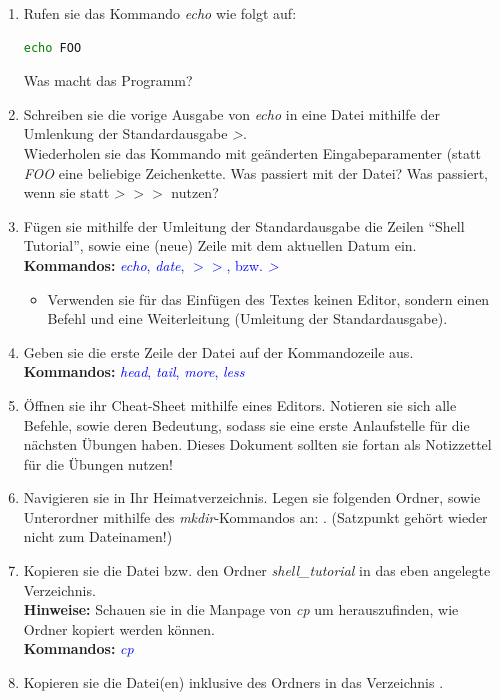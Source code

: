 \documentclass[paper=a4,fontsize=11pt]{scrartcl}%
\numberwithin{equation}{section}
\begin{document}
\begin{enumerate}
\begin{enumerate}[label=(\alph*)]
		\item Rufen sie das Kommando \emph{echo} wie folgt auf:
		\begin{lstlisting}[style=Bash, language=Bash]
echo FOO
\end{lstlisting}
		Was macht das Programm?
		\item Schreiben sie die vorige Ausgabe von \emph{echo} in eine Datei mithilfe der Umlenkung der Standardausgabe \emph{>}.\\
		Wiederholen sie das Kommando mit geänderten Eingabeparamenter (statt \emph{FOO} eine beliebige Zeichenkette. Was passiert mit der Datei? Was passiert, wenn sie statt \emph{>} \emph{$>>$} nutzen?
		\item Fügen sie mithilfe der Umleitung der Standardausgabe die Zeilen \enquote{Shell Tutorial}, sowie eine (neue) Zeile mit dem aktuellen Datum ein.\\
		\textbf{Kommandos:} \textcolor{blue}{\emph{echo}, \emph{date}, $>>$, bzw. \emph{>}}
		\begin{itemize}
			\item \small Verwenden sie für das Einfügen des Textes keinen Editor, sondern einen Befehl und eine Weiterleitung (Umleitung der Standardausgabe).
		\end{itemize}
		\item Geben sie die erste Zeile der Datei auf der Kommandozeile aus.\\
		\textbf{Kommandos:} \textcolor{blue}{\emph{head}, \emph{tail}, \emph{more}, \emph{less}}
		\item Öffnen sie ihr Cheat-Sheet mithilfe eines Editors. Notieren sie sich alle Befehle, sowie deren Bedeutung, sodass sie eine erste Anlaufstelle für die nächsten Übungen haben. Dieses Dokument sollten sie fortan als Notizzettel für die Übungen nutzen!
		\item Navigieren sie in Ihr Heimatverzeichnis. Legen sie folgenden Ordner, sowie Unterordner mithilfe des \emph{mkdir}-Kommandos an: . (Satzpunkt gehört wieder nicht zum Dateinamen!)
		\item Kopieren sie die Datei bzw. den Ordner \emph{shell\_tutorial} in das eben angelegte Verzeichnis.\\
		\textbf{Hinweise:} Schauen sie in die Manpage von \emph{cp} um herauszufinden, wie Ordner kopiert werden können.\\
		\textbf{Kommandos:} \textcolor{blue}{\emph{cp} }
        \item Kopieren sie die Datei(en) inklusive des Ordners  in das Verzeichnis .

\end{enumerate}
\end{enumerate}
\end{document}
